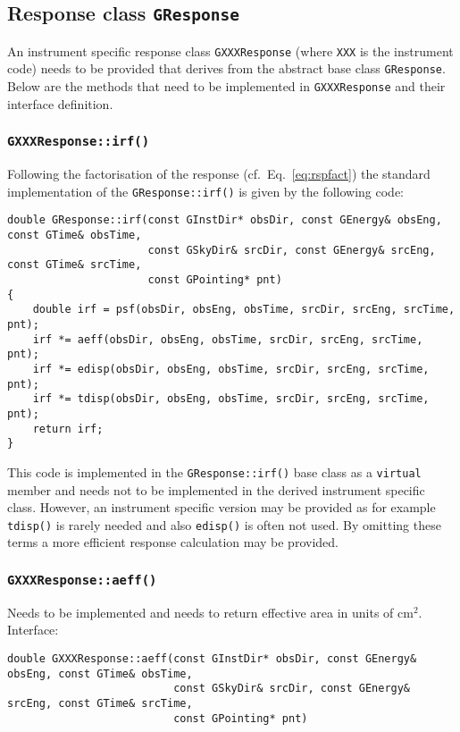 \documentclass{article}[12pt,a4]
\begin{document}
\subsection{Response class {\tt GResponse}}

An instrument specific response class {\tt GXXXResponse} (where {\tt XXX} is the instrument code)
needs to be provided that derives from the abstract base class {\tt GResponse}.
Below are the methods that need to be implemented in {\tt GXXXResponse} and their interface
definition.

\subsubsection{{\tt GXXXResponse::irf()}}

Following the factorisation of the response (cf.~Eq.~\ref{eq:rspfact}) the standard implementation
of the {\tt GResponse::irf()} is given by the following code:
\begin{verbatim}
double GResponse::irf(const GInstDir* obsDir, const GEnergy& obsEng, const GTime& obsTime,
                      const GSkyDir& srcDir, const GEnergy& srcEng, const GTime& srcTime,
                      const GPointing* pnt)
{
    double irf = psf(obsDir, obsEng, obsTime, srcDir, srcEng, srcTime, pnt);
    irf *= aeff(obsDir, obsEng, obsTime, srcDir, srcEng, srcTime, pnt);
    irf *= edisp(obsDir, obsEng, obsTime, srcDir, srcEng, srcTime, pnt);
    irf *= tdisp(obsDir, obsEng, obsTime, srcDir, srcEng, srcTime, pnt);
    return irf;
}
\end{verbatim}
This code is implemented in the {\tt GResponse::irf()} base class as a {\tt virtual} member and
needs not to be implemented in the derived instrument specific class.
However, an instrument specific version may be provided as for example {\tt tdisp()} is rarely
needed and also {\tt edisp()} is often not used.
By omitting these terms a more efficient response calculation may be provided.


\subsubsection{{\tt GXXXResponse::aeff()}}

Needs to be implemented and needs to return effective area in units of cm$^2$.
Interface:
\begin{verbatim}
double GXXXResponse::aeff(const GInstDir* obsDir, const GEnergy& obsEng, const GTime& obsTime,
                          const GSkyDir& srcDir, const GEnergy& srcEng, const GTime& srcTime,
                          const GPointing* pnt)
\end{verbatim}
\end{document}
